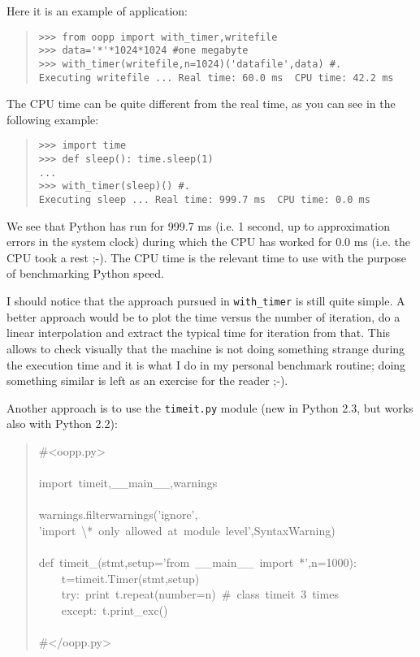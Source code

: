 \documentclass[10pt,english]{article}
\begin{document}
Here it is an example of application:
\begin{quote}
\begin{verbatim}>>> from oopp import with_timer,writefile
>>> data='*'*1024*1024 #one megabyte
>>> with_timer(writefile,n=1024)('datafile',data) #.
Executing writefile ... Real time: 60.0 ms  CPU time: 42.2 ms\end{verbatim}
\end{quote}

The CPU time can be quite different from the real time, 
as you can see in the following example:
\begin{quote}
\begin{verbatim}>>> import time
>>> def sleep(): time.sleep(1)
...
>>> with_timer(sleep)() #.
Executing sleep ... Real time: 999.7 ms  CPU time: 0.0 ms\end{verbatim}
\end{quote}

We see that Python has run for 999.7 ms (i.e. 1 second, up to
approximation errors in the system clock) during which the CPU has 
worked for 0.0 ms (i.e. the CPU took a rest ;-).
The CPU time is the relevant time to use with the purpose of
benchmarking Python speed.

I should notice that the approach pursued in \texttt{with{\_}timer} is still
quite simple. A better approach would be to
plot the time versus the number of iteration, do a linear interpolation
and extract the typical time for iteration from that. This allows
to check visually that the machine is not doing something strange
during the execution time and it is what
I do in my personal benchmark routine; doing something similar is
left as an exercise for the reader ;-).

Another approach is to use the \texttt{timeit.py} module (new in Python 2.3,
but works also with Python 2.2):
\begin{quote}
\begin{ttfamily}\begin{flushleft}
\mbox{{\#}<oopp.py>}\\
\mbox{}\\
\mbox{import~timeit,{\_}{\_}main{\_}{\_},warnings}\\
\mbox{}\\
\mbox{warnings.filterwarnings('ignore',}\\
\mbox{'import~{\textbackslash}*~only~allowed~at~module~level',SyntaxWarning)}\\
\mbox{}\\
\mbox{def~timeit{\_}(stmt,setup='from~{\_}{\_}main{\_}{\_}~import~*',n=1000):}\\
\mbox{~~~~t=timeit.Timer(stmt,setup)}\\
\mbox{~~~~try:~print~t.repeat(number=n)~{\#}~class~timeit~3~times}\\
\mbox{~~~~except:~t.print{\_}exc()}\\
\mbox{}\\
\mbox{{\#}</oopp.py>}
\end{flushleft}\end{ttfamily}
\end{quote}
\end{document}
